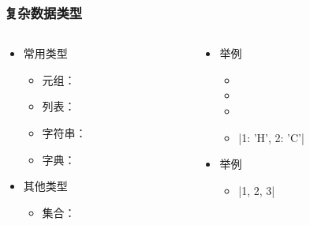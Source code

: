 \begin{frame} [fragile]
	\frametitle{复杂数据类型}
	\linespread{2}
	\begin{columns}[T]
		\begin{column}[T]{.5\textwidth}
			\begin{itemize}
			\item 常用类型
				\begin{itemize}
				\item 元组：
				\item 列表：
				\item 字符串：
				\item 字典：
				\end{itemize}
			\item 其他类型
				\begin{itemize}
				\item 集合：
				\end{itemize}
			\end{itemize}
		\end{column}
		\begin{column}[T]{.5\textwidth}
			\begin{itemize}
			\item 举例
				\begin{itemize}
				\item {}
				\item {}
				\item {}
				\item \inlinePython|{1: 'H', 2: 'C'}|
				\end{itemize}
			\item 举例
				\begin{itemize}
				\item \inlinePython|{1, 2, 3}|
				\end{itemize}
			\end{itemize}
		\end{column}
	\end{columns}
\end{frame}

